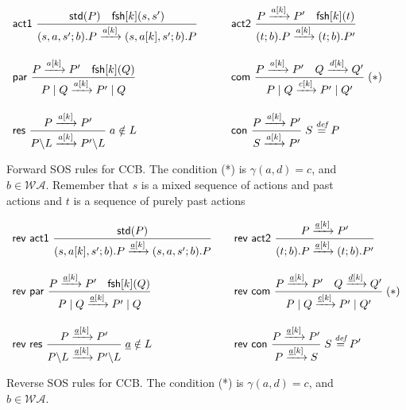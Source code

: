 \documentclass[runningheads]{llncs}
\newcommand{\Rule}[2]{\displaystyle{\frac{#1}{#2}}}
\newcommand{\paral}{\; \vert \;}
\newcommand{\mA}{\mathcal{A}}
\newcommand{\mAK}{\mathcal{AK}}
\newcommand{\rom}[1]{\mbox{\rm{#1}}}
\newcommand{\std}[1]{\mathsf{std}(#1)}
\newcommand{\fresh}[2]{\mathsf{fsh}[#1](#2)}
\newcommand{\bydef}{\stackrel{\emph{def}}{=}}
\newcommand{\rulename}[1]{\textsf{#1}}
\begin{document}
\begin{figure}
\[
\begin{array}{ll}
\rulename{act1}\ 
\Rule
{\std{P} \quad \fresh{k}{s,s'}}
{(s,a,s';b).P \xrightarrow{a[k]}(s,a[k],s';b).P}
\qquad &
\rulename{act2}\
\Rule
{P \xrightarrow{a[k]} P' \quad \fresh{k}{t}}
{(t;b).P \xrightarrow{a[k]} (t;b).P'}
\\[25pt]
\rulename{par}\
\Rule
{P \xrightarrow{a[k]} P'\quad \fresh{k}{Q}}
{P \paral Q \xrightarrow{a[k]} P' \paral Q}
\qquad &
\rulename{com}\
\Rule
{P \xrightarrow{a[k]} P' \quad Q \xrightarrow{d[k]} Q'}
{P \paral Q \xrightarrow{c[k]} P' \paral Q'}
\; (*)
%
\\[25pt]
\rulename{res}\
\Rule
{P \xrightarrow{a[k]} P'}
{P\backslash L \xrightarrow{a[k]} P'\backslash L}
\; a \notin L
\qquad &
\rulename{con}\
\Rule
{P \xrightarrow{a[k]} P'}
{S \xrightarrow{a[k]} P'}
\; S \bydef P
\end{array}
\] 
\caption[Forward SOS rules for CCB.]{Forward SOS rules for CCB. The condition (*) is $\gamma(a,d)=c$, 
and $b \in \mathcal{WA}$. Remember that $s$ is a mixed sequence of actions and past actions and $t$ is a sequence of purely past actions} \label{fig:fsos}
\end{figure}


\begin{figure}
\[
\begin{array}{ll}
\rulename{rev act1}\
\Rule
{\std{P} %
}
{(s,a[k],s';b).P \xrightarrow{\underline{a}[k]}(s,a,s';b).P}
\quad &
%
%
%
\rulename{rev act2}\
\Rule
{P \xrightarrow{\underline{a}[k]} P' %
}
{(t;b).P \xrightarrow{\underline{a}[k]} (t;b).P'}
\\[25pt]
\rulename{rev par}\
\Rule
{P \xrightarrow{\underline{a}[k]} P'\quad \fresh{k}{Q}}
{P \paral Q \xrightarrow{\underline{a}[k]} P' \paral Q}
\quad &
\rulename{rev com}\
\Rule
{P \xrightarrow{\underline{a}[k]} P' \quad Q \xrightarrow{\underline{d}[k]} Q'}
{P \paral Q \xrightarrow{\underline{c}[k]} P' \paral Q'}
\; (*)
%
\\[25pt]
\rulename{rev res}\
\Rule
{P \xrightarrow{\underline{a}[k]} P'}
{P\backslash L \xrightarrow{\underline{a}[k]} P'\backslash L}
\; \underline{a} \notin L
\quad &
\rulename{rev con}\
\Rule
{P \xrightarrow{\underline{a}[k]} P'}
{P \xrightarrow{\underline{a}[k]} S}
\; S \bydef P'
\end{array}
\]
\caption[Reverse SOS rules for CCB.]{Reverse SOS rules for CCB. The condition (*) is $\gamma(a,d)=c$, and $b \in \mathcal{WA}$. %
} 
\label{fig:reversesos}
\end{figure}
\end{document}
